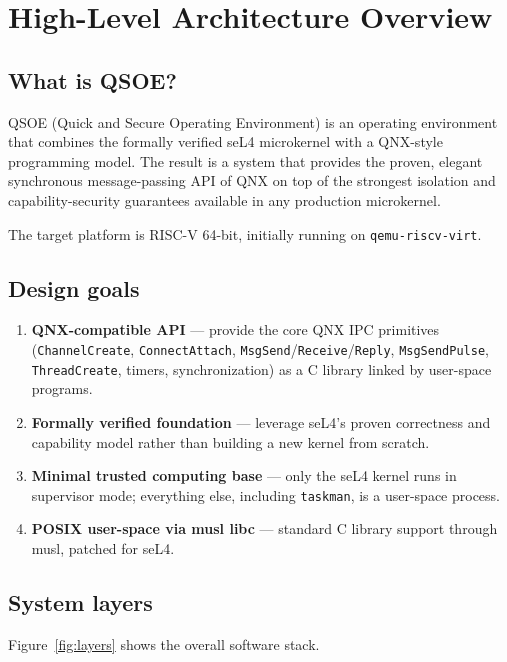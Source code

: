 \chapter{High-Level Architecture Overview}

\section{What is QSOE?}

QSOE (Quick and Secure Operating Environment) is an operating environment
that combines the formally verified seL4 microkernel with a
QNX-style programming model.  The result is a system that provides
the proven, elegant synchronous message-passing API of QNX on top of the
strongest isolation and capability-security guarantees available in any
production microkernel.

The target platform is RISC-V 64-bit, initially running on
\texttt{qemu-riscv-virt}.

\section{Design goals}

\begin{enumerate}
    \item \textbf{QNX-compatible API} --- provide the core QNX IPC
        primitives (\texttt{ChannelCreate}, \texttt{ConnectAttach},
        \texttt{MsgSend}/\texttt{Receive}/\texttt{Reply},
        \texttt{MsgSendPulse}, \texttt{ThreadCreate}, timers,
        synchronization) as a C library linked by user-space programs.
    \item \textbf{Formally verified foundation} --- leverage seL4's
        proven correctness and capability model rather than building a
        new kernel from scratch.
    \item \textbf{Minimal trusted computing base} --- only the seL4
        kernel runs in supervisor mode; everything else, including
        \texttt{taskman}, is a user-space process.
    \item \textbf{POSIX user-space via musl libc} --- standard C library
        support through musl, patched for seL4.
\end{enumerate}

\section{System layers}

Figure~\ref{fig:layers} shows the overall software stack.

